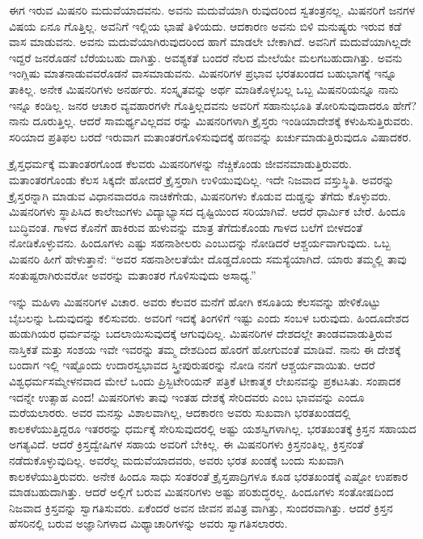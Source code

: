 ಈಗ ಇರುವ ಮಿಷನರಿ ಮದುವೆಯಾದವನು. ಅವನು ಮದುವೆಯಾಗಿ ರುವುದರಿಂದ ಸ್ವತಂತ್ರನಲ್ಲ. ಮಿಷನರಿಗೆ ಜನಗಳ ವಿಷಯ ಏನೂ ಗೊತ್ತಿಲ್ಲ. ಅವನಿಗೆ ಇಲ್ಲಿಯ ಭಾಷೆ ತಿಳಿಯದು. ಆದಕಾರಣ ಅವನು ಬಿಳಿ ಮನುಷ್ಯರು ಇರುವ ಕಡೆ ವಾಸ ಮಾಡುವನು. ಅವನು ಮದುವೆಯಾಗಿರುವುದರಿಂದ ಹಾಗೆ ಮಾಡಲೇ ಬೇಕಾಗಿದೆ. ಅವನಿಗೆ ಮದುವೆಯಾಗಿಲ್ಲದೇ ಇದ್ದರೆ ಜನರೊಡನೆ ಬೆರೆಯಬಹು ದಾಗಿತ್ತು. ಅವಶ್ಯಕತೆ ಬಂದರೆ ನೆಲದ ಮೇಲೆಯೇ ಮಲಗಬಹುದಾಗಿತ್ತು. ಅವನು ಇಂಗ್ಲಿಷು ಮಾತನಾಡುವವರೊಡನೆ ವಾಸಮಾಡುವನು. ಮಿಷನರಿಗಳ ಪ್ರಭಾವ ಭರತಖಂಡದ ಬಹುಭಾಗಕ್ಕೆ ಇನ್ನೂ ತಾಕಿಲ್ಲ. ಅನೇಕ ಮಿಷನರಿಗಳು ಅನರ್ಹರು. ಸಂಸ್ಕೃತವನ್ನು ಅರ್ಥ ಮಾಡಿಕೊಳ್ಳಬಲ್ಲ ಒಬ್ಬ ಮಿಷನರಿಯನ್ನೂ ನಾನು ಇನ್ನೂ ಕಂಡಿಲ್ಲ. ಜನರ ಆಚಾರ ವ್ಯವಹಾರಗಳೇ ಗೊತ್ತಿಲ್ಲದವನು ಅವರಿಗೆ ಸಹಾನುಭೂತಿ ತೋರಿಸುವುದಾದರೂ ಹೇಗೆ? ನಾನು ದೂರುತ್ತಿಲ್ಲ. ಆದರೆ ಸಾಮರ್ಥ್ಯವಿಲ್ಲದವ ರನ್ನು ಮಿಷನರಿಗಳಾಗಿ ಕ್ರೈಸ್ತರು ಇಂಡಿಯಾದೇಶಕ್ಕೆ ಕಳುಹಿಸುತ್ತಿರುವರು. ಸರಿಯಾದ ಪ್ರತಿಫಲ ಬರದೆ ಇರುವಾಗ ಮತಾಂತರಗೊಳಿಸುವುದಕ್ಕೆ ಹಣವನ್ನು ಖರ್ಚುಮಾಡುತ್ತಿರುವುದೂ ವಿಷಾದಕರ.

ಕ್ರೈಸ್ತಧರ್ಮಕ್ಕೆ ಮತಾಂತರಗೊಂಡ ಕೆಲವರು ಮಿಷನರಿಗಳನ್ನು ನೆಚ್ಚಿಕೊಂಡು ಜೀವನಮಾಡುತ್ತಿರುವರು. ಮತಾಂತರಗೊಂಡು ಕೆಲಸ ಸಿಕ್ಕದೇ ಹೋದರೆ ಕ್ರೈಸ್ತರಾಗಿ ಉಳಿಯುವುದಿಲ್ಲ. ಇದೇ ನಿಜವಾದ ವಸ್ತುಸ್ಥಿತಿ. ಅವರನ್ನು ಕ್ರೈಸ್ತರನ್ನಾಗಿ ಮಾಡುವ ವಿಧಾನವಾದರೂ ನಾಚಿಕೆಗೇಡು, ಮಿಷನರಿಗಳು ಕೊಡುವ ದುಡ್ಡನ್ನು ತೆಗೆದು ಕೊಳ್ಳುವರು. ಮಿಷನರಿಗಳು ಸ್ಥಾಪಿಸಿದ ಕಾಲೇಜುಗಳು ವಿದ್ಯಾಭ್ಯಾಸದ ದೃಷ್ಟಿಯಿಂದ ಸರಿಯಾಗಿವೆ. ಆದರೆ ಧಾರ್ಮಿಕ ಬೇರೆ. ಹಿಂದೂ ಬುದ್ಧಿವಂತ. ಗಾಳದ ಕೊನೆಗೆ ಹಾಕಿರುವ ಹುಳುವನ್ನು ಮಾತ್ರ ತೆಗೆದುಕೊಂಡು ಗಾಳದ ಬಲೆಗೆ ಬೀಳದಂತೆ ನೋಡಿಕೊಳ್ಳುವನು. ಹಿಂದೂಗಳು ಎಷ್ಟು ಸಹನಾಶೀಲರು ಎಂಬುದನ್ನು ನೋಡಿದರೆ ಆಶ್ಚರ್ಯವಾಗುವುದು. ಒಬ್ಬ ಮಿಷನರಿ ಹೀಗೆ ಹೇಳುತ್ತಾನೆ: “ಅವರ ಸಹನಾಶೀಲತೆಯೇ ದೊಡ್ಡದೊಂದು ಸಮಸ್ಯೆಯಾಗಿದೆ. ಯಾರು ತಮ್ಮಲ್ಲಿ ತಾವು ಸಂತುಷ್ಟರಾಗಿರುವರೋ ಅವರನ್ನು ಮತಾಂತರ ಗೊಳಿಸುವುದು ಅಸಾಧ್ಯ.”

ಇನ್ನು ಮಹಿಳಾ ಮಿಷನರಿಗಳ ವಿಚಾರ. ಅವರು ಕೆಲವರ ಮನೆಗೆ ಹೋಗಿ ಕಸೂತಿಯ ಕೆಲಸವನ್ನು ಹೇಳಿಕೊಟ್ಟು ಬೈಬಲನ್ನು ಓದುವುದನ್ನು ಕಲಿಸುವರು. ಅವರಿಗೆ ಇದಕ್ಕೆ ತಿಂಗಳಿಗೆ ಇಷ್ಟು ಎಂದು ಸಂಬಳ ಬರುವುದು. ಹಿಂದೂದೇಶದ ಹುಡುಗಿಯರ ಧರ್ಮವನ್ನು ಬದಲಾಯಿಸುವುದಕ್ಕೆ ಆಗುವುದಿಲ್ಲ. ಮಿಷನರಿಗಳ ದೇಶದಲ್ಲೇ ತಾಂಡವವಾಡುತ್ತಿರುವ ನಾಸ್ತಿಕತೆ ಮತ್ತು ಸಂಶಯ ಇವೇ ಇವರನ್ನು ತಮ್ಮ ದೇಶದಿಂದ ಹೊರಗೆ ಹೋಗುವಂತೆ ಮಾಡಿವೆ. ನಾನು ಈ ದೇಶಕ್ಕೆ ಬಂದಾಗ ಇಲ್ಲಿ ಇಷ್ಟೊಂದು ಉದಾರಸ್ವಭಾವದ ಸ್ತ್ರೀಪುರುಷರನ್ನು ನೋಡಿ ನನಗೆ ಆಶ್ಚರ್ಯವಾಯಿತು. ಆದರೆ ವಿಶ್ವಧರ್ಮಸಮ್ಮೇಳನವಾದ ಮೇಲೆ ಒಂದು ಪ್ರಿಸ್ಬಿಟೇರಿಯನ್​ ಪತ್ರಿಕೆ ಟೀಕಾತ್ಮಕ ಲೇಖನವನ್ನು ಪ್ರಕಟಸಿತು. ಸಂಪಾದಕ ಇದನ್ನೇ ಉತ್ಸಾಹ ಎಂದ! ಮಿಷನರಿಗಳು ತಾವು ಇಂತಹ ದೇಶಕ್ಕೆ ಸೇರಿದವರು ಎಂಬ ಭಾವವನ್ನು ಎಂದೂ ಮರೆಯಲಾರರು. ಅವರ ಮನಸ್ಸು ವಿಶಾಲವಾಗಿಲ್ಲ, ಆದಕಾರಣ ಅವರು ಸುಖವಾಗಿ ಭರತಖಂಡದಲ್ಲಿ ಕಾಲಕಳೆಯುತ್ತಿದ್ದರೂ ಇತರರನ್ನು ಧರ್ಮಕ್ಕೆ ಸೇರಿಸುವುದರಲ್ಲಿ ಅಷ್ಟು ಯಶಸ್ವಿಗಳಾಗಿಲ್ಲ. ಭರತಖಂತಕ್ಕೆ ಕ್ರಿಸ್ತನ ಸಹಾಯದ ಅಗತ್ಯವಿದೆ. ಆದರೆ ಕ್ರಿಸ್ತದ್ವೇಷಿಗಳ ಸಹಾಯ ಅವರಿಗೆ ಬೇಕಿಲ್ಲ. ಈ ಮಿಷನರಿಗಳು ಕ್ರಿಸ್ತನಂತಿಲ್ಲ, ಕ್ರಿಸ್ತನಂತೆ ನಡೆದುಕೊಳ್ಳುವುದಿಲ್ಲ. ಅವರೆಲ್ಲ ಮದುವೆಯಾದವರು, ಅವರು ಭರತ ಖಂಡಕ್ಕೆ ಬಂದು ಸುಖವಾಗಿ ಕಾಲಕಳೆಯುತ್ತಿರುವರು. ಅನೇಕ ಹಿಂದೂ ಸಾಧು ಸಂತರಂತೆ ಕ್ರೈಸ್ತಪಾದ್ರಿಗಳೂ ಕೂಡ ಭರತಖಂಡಕ್ಕೆ ಎಷ್ಟೋ ಉಪಕಾರ ಮಾಡಬಹುದಾಗಿತ್ತು. ಆದರೆ ಅಲ್ಲಿಗೆ ಬರುವ ಮಿಷನರಿಗಳು ಅಷ್ಟು ಪರಿಶುದ್ಧರಲ್ಲ. ಹಿಂದೂಗಳು ಸಂತೋಷದಿಂದ ನಿಜವಾದ ಕ್ರಿಸ್ತವನ್ನು ಸ್ವಾಗತಿಸುವರು. ಏಕೆಂದರೆ ಅವನ ಜೀವನ ಪವಿತ್ರ ವಾಗಿತ್ತು, ಸುಂದರವಾಗಿತ್ತು. ಆದರೆ ಕ್ರಿಸ್ತನ ಹೆಸರಿನಲ್ಲಿ ಬರುವ ಅಜ್ಞಾನಿಗಳಾದ ಮಿಥ್ಯಾಚಾರಿಗಳನ್ನು ಅವರು ಸ್ವಾಗತಿಸಲಾರರು.

